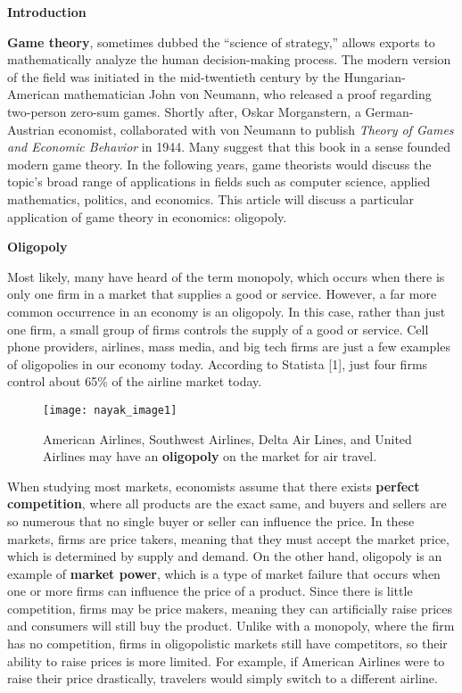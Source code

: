 
\noindent
\textbf{Introduction}

\textbf{Game theory}, sometimes dubbed the “science of strategy,” allows exports to mathematically analyze the human decision-making process. The modern version of the field was initiated in the mid-twentieth century by the Hungarian-American mathematician John von Neumann, who released a proof regarding two-person zero-sum games. Shortly after, Oskar Morganstern, a German-Austrian economist, collaborated with von Neumann to publish \emph{Theory of Games and Economic Behavior} in 1944. Many suggest that this book in a sense founded modern game theory. In the following years, game theorists would discuss the topic’s broad range of applications in fields such as computer science, applied mathematics, politics, and economics. This article will discuss a particular application of game theory in economics: oligopoly.

\noindent
\textbf{Oligopoly}

Most likely, many have heard of the term monopoly, which occurs when there is only one firm in a market that supplies a good or service. However, a far more common occurrence in an economy is an oligopoly. In this case, rather than just one firm, a small group of firms controls the supply of a good or service. Cell phone providers, airlines, mass media, and big tech firms are just a few examples of oligopolies in our economy today. According to Statista [1], just four firms control about 65\% of the airline market today.

\renewcommand{\thefigure}{1}
\begin{figure}[htp]
    \centering
    \begin{minipage}{10cm}
    \texttt{[image: nayak\_image1]}
    \caption{American Airlines, Southwest Airlines, Delta Air Lines, and United Airlines may have an \textbf{oligopoly} on the market for air travel.}
    \label{fig:1}
    \end{minipage}
\end{figure}

\pagebreak
	When studying most markets, economists assume that there exists \textbf{perfect competition}, where all products are the exact same, and buyers and sellers are so numerous that no single buyer or seller can influence the price. In these markets, firms are price takers, meaning that they must accept the market price, which is determined by supply and demand. On the other hand, oligopoly is an example of \textbf{market power}, which is a type of market failure that occurs when one or more firms can influence the price of a product. Since there is little competition, firms may be price makers, meaning they can artificially raise prices and consumers will still buy the product. Unlike with a monopoly, where the firm has no competition, firms in oligopolistic markets still have competitors, so their ability to raise prices is more limited. For example, if American Airlines were to raise their price drastically, travelers would simply switch to a different airline.

